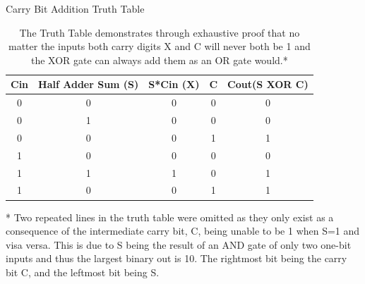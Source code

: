 \documentclass[11pt]{article}
\begin{document}
\begin{table}[!htb]\centering\caption{Carry Bit Addition Truth Table}\label{tbl:example_table}\begin{tabular}{c|c|c|c|c}\toprule Cin & Half Adder Sum (S) & S*Cin (X) & C & Cout(S XOR C) \\\midrule0 & 0 & 0 & 0 & 0  \\0 & 1 & 0 & 0 & 0 \\0 & 0 & 0 & 1 & 1 \\1 & 0 & 0 & 0 & 0 \\1 & 1 & 1 & 0 & 1 \\1 & 0 & 0 & 1 & 1 \\\bottomrule\end{tabular} \caption{The Truth Table demonstrates through exhaustive proof that no matter the inputs both carry digits X and C will never both be 1 and the XOR gate can always add them as an OR gate would.*}

* Two repeated lines in the truth table were omitted as they only exist as a consequence of the intermediate carry bit, C, being unable to be 1 when S=1 and visa versa. This is due to S being the result of an AND gate of only two one-bit inputs and thus the largest binary out is 10. The rightmost bit being the carry bit C, and the leftmost bit being S. 
\end{table}
\end{document}
